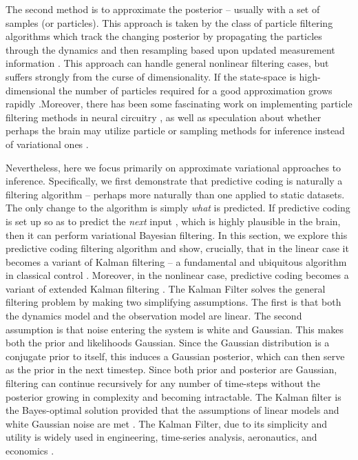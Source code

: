 The second method is to approximate the posterior -- usually with a set of samples (or particles). This approach is taken by the class of particle filtering algorithms which track the changing posterior by propagating the particles through the dynamics and then resampling based upon updated measurement information \citep*{arulampalam2002tutorial,gordon1993novel}. This approach can handle general nonlinear filtering cases, but suffers strongly from the curse of dimensionality. If the state-space is high-dimensional the number of particles required for a good approximation grows rapidly \citep*{doucet2000sequential}.Moreover, there has been some fascinating work on implementing particle filtering methods in neural circuitry \citep*{kutschireiter2015neural}, as well as speculation about whether perhaps the brain may utilize particle or sampling methods for inference instead of variational ones \citep{sanborn2016Bayesian}.

Nevertheless, here we focus primarily on approximate variational approaches to inference. Specifically, we first demonstrate that predictive coding is naturally a filtering algorithm -- perhaps more naturally than one applied to static datasets. The only change to the algorithm is simply \emph{what} is predicted. If predictive coding is set up so as to predict the \emph{next} input \citep{mumford1992computational,clark_whatever_2013}, which is highly plausible in the brain, then it can perform variational Bayesian filtering. In this section, we explore this predictive coding filtering algorithm and show, crucially, that in the linear case it becomes a variant of Kalman filtering -- a fundamental and ubiquitous algorithm in classical control \citep{kalman1960contributions,kalman1960new}. Moreover, in the nonlinear case, predictive coding becomes a variant of extended Kalman filtering \citep{ollivier2019extended}. The Kalman Filter solves the general filtering problem by making two simplifying assumptions. The first is that both the dynamics model and the observation model are linear. The second assumption is that noise entering the system is white and Gaussian. This makes both the prior and likelihoods Gaussian. Since the Gaussian distribution is a conjugate prior to itself, this induces a Gaussian posterior, which can then serve as the prior in the next timestep. Since both prior and posterior are Gaussian, filtering can continue recursively for any number of time-steps without the posterior growing in complexity and becoming intractable. The Kalman filter is the Bayes-optimal solution provided that the assumptions of linear models and white Gaussian noise are met \citep*{kalman1960new}. The Kalman Filter, due to its simplicity and utility is widely used in engineering, time-series analysis, aeronautics, and economics \citep*{grewal2010applications,leondes1970theory,schneider1988analytical,harvey1990forecasting}.

